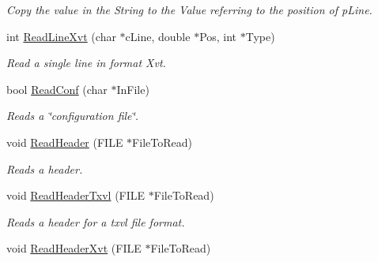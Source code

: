 \begin{DoxyCompactItemize}
\begin{DoxyCompactList}\small\item\em Copy the value in the String to the Value referring to the position of p\+Line. \end{DoxyCompactList}\item 
int \hyperlink{classVarData_aa7f1d8e6b048273ed4b7fc4b653427d0}{Read\+Line\+Xvt} (char $\ast$c\+Line, double $\ast$Pos, int $\ast$Type)\hypertarget{classVarData_aa7f1d8e6b048273ed4b7fc4b653427d0}{}\label{classVarData_aa7f1d8e6b048273ed4b7fc4b653427d0}

\begin{DoxyCompactList}\small\item\em Read a single line in format Xvt. \end{DoxyCompactList}\item 
bool \hyperlink{classVarData_a36c85650c83c9e9e2c97b29ebbf4e782}{Read\+Conf} (char $\ast$In\+File)\hypertarget{classVarData_a36c85650c83c9e9e2c97b29ebbf4e782}{}\label{classVarData_a36c85650c83c9e9e2c97b29ebbf4e782}

\begin{DoxyCompactList}\small\item\em Reads a \char`\"{}configuration file\char`\"{}. \end{DoxyCompactList}\item 
void \hyperlink{classVarData_a736de4373227d565d6f180ab22d2d0b6}{Read\+Header} (F\+I\+LE $\ast$File\+To\+Read)\hypertarget{classVarData_a736de4373227d565d6f180ab22d2d0b6}{}\label{classVarData_a736de4373227d565d6f180ab22d2d0b6}

\begin{DoxyCompactList}\small\item\em Reads a header. \end{DoxyCompactList}\item 
void \hyperlink{classVarData_ac1814e547141bc5cd56849c70bec46e0}{Read\+Header\+Txvl} (F\+I\+LE $\ast$File\+To\+Read)\hypertarget{classVarData_ac1814e547141bc5cd56849c70bec46e0}{}\label{classVarData_ac1814e547141bc5cd56849c70bec46e0}

\begin{DoxyCompactList}\small\item\em Reads a header for a txvl file format. \end{DoxyCompactList}\item 
void \hyperlink{classVarData_a58e4738e2a7b25eaafbe3e2c623a04ae}{Read\+Header\+Xvt} (F\+I\+LE $\ast$File\+To\+Read)\hypertarget{classVarData_a58e4738e2a7b25eaafbe3e2c623a04ae}{}\label{classVarData_a58e4738e2a7b25eaafbe3e2c623a04ae}


\end{DoxyCompactItemize}
